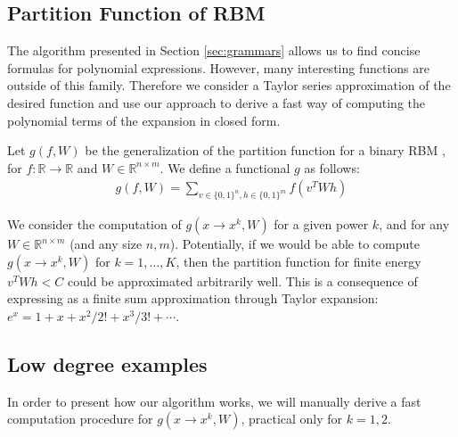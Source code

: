\subsection{Partition Function of RBM} \label{partitionfunction}

The algorithm presented in Section
\ref{sec:grammars} allows us to find concise formulas for polynomial expressions.
However, many interesting functions are outside of this
family. Therefore we consider a Taylor series approximation of the desired function
and use our approach to derive a fast way of computing the polynomial
terms of the expansion in closed form.

Let $g(f, W)$ be the generalization of the partition function for a binary
RBM \cite{hinton2002training}, for $f: \mathbb{R} \rightarrow \mathbb{R}$ and $W \in \mathbb{R}^{n \times m}$.
We define a functional $g$ as follows: \\
\vspace{-0.3cm}
\begin{align*}
g(f, W) = \sum_{v \in \{0, 1\}^n, h \in \{0, 1\}^m} f(v^TWh)
\end{align*}
\vspace{-0.1cm}

We consider the computation of $g(x \rightarrow x^k, W)$ for a given power
$k$, and for any $W \in \mathbb{R}^{n \times m}$ (and any size $n, m$). Potentially, if we would be able
to compute $g(x \rightarrow x^k, W)$ for $k = 1, \dots, K$, then the partition
function for finite energy $v^TWh < C$ could be approximated arbitrarily well.
This is a consequence of expressing as a finite sum approximation through
Taylor expansion: $e^{x}=1+x+x^2/2!+x^3/3!+\cdots$.

\subsection{Low degree examples} In order to present how our algorithm works,
we will manually derive a fast computation procedure for $g(x
\rightarrow x^k, W)$, practical only for $k = 1, 2$. 


